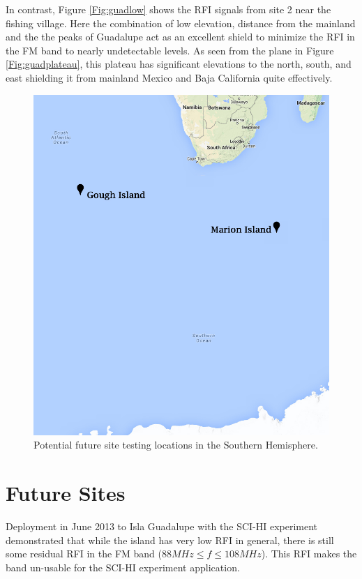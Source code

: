 In contrast, Figure \ref{Fig:guadlow} shows the RFI signals from site 2 near the fishing village. Here the combination of low elevation, distance from the mainland and the the peaks of Guadalupe act as an excellent shield to minimize the RFI in the FM band to nearly undetectable levels. As seen from the plane in Figure \ref{Fig:guadplateau}, this plateau has significant elevations to the north, south, and east shielding it from mainland Mexico and Baja California quite effectively. 

\begin{figure}[htb]
\begin{center}
\includegraphics[width=0.9\linewidth]{RFI_testing/figures/site_testing_south.jpg}
\caption{Potential future site testing locations in the Southern Hemisphere.}
\label{Fig:site_map_south}
\end{center}
\end{figure}



\section{Future Sites}

Deployment in June 2013 to Isla Guadalupe with the SCI-HI experiment demonstrated that while the island has very low RFI in general, there is still some residual RFI in the FM band ($88 MHz \leq f \leq 108 MHz$). This RFI makes the band un-usable for the SCI-HI experiment application. 

